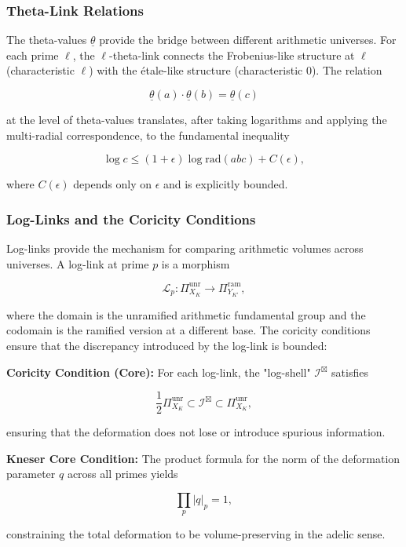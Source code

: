\documentclass[12pt,a4paper]{article}
\begin{document}
\subsubsection{Theta-Link Relations}

The theta-values $\underline{\theta}$ provide the bridge between different arithmetic universes. For each prime $\ell$, the $\ell$-theta-link connects the Frobenius-like structure at $\ell$ (characteristic $\ell$) with the étale-like structure (characteristic $0$). The relation

\[\underline{\theta}(a) \cdot \underline{\theta}(b) = \underline{\theta}(c)\]

at the level of theta-values translates, after taking logarithms and applying the multi-radial correspondence, to the fundamental inequality

\[\log c \leq (1 + \epsilon) \log \text{rad}(abc) + C(\epsilon),\]

where $C(\epsilon)$ depends only on $\epsilon$ and is explicitly bounded.

\subsubsection{Log-Links and the Coricity Conditions}

Log-links provide the mechanism for comparing arithmetic volumes across universes. A log-link at prime $p$ is a morphism

\[\mathcal{L}_p: \Pi^{\text{unr}}_{X_K} \to \Pi^{\text{ram}}_{Y_{K'}},\]

where the domain is the unramified arithmetic fundamental group and the codomain is the ramified version at a different base. The coricity conditions ensure that the discrepancy introduced by the log-link is bounded:

\textbf{Coricity Condition (Core):} For each log-link, the "log-shell" $\mathcal{I}^\boxtimes$ satisfies

\[\frac{1}{2} \Pi^{\text{unr}}_{X_K} \subset \mathcal{I}^\boxtimes \subset \Pi^{\text{unr}}_{X_K},\]

ensuring that the deformation does not lose or introduce spurious information.

\textbf{Kneser Core Condition:} The product formula for the norm of the deformation parameter $q$ across all primes yields

\[\prod_p |q|_p = 1,\]

constraining the total deformation to be volume-preserving in the adelic sense.
\end{document}
